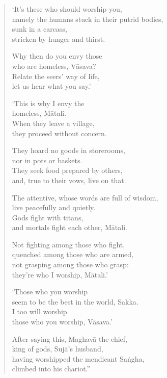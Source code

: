 \documentclass[12pt,openany]{book}%
\begin{document}
\begin{verse}%
‘It’s these who should worship you, \\
namely the humans stuck in their putrid bodies, \\
sunk in a carcass, \\
stricken by hunger and thirst. 

Why then do you envy those \\
who are homeless, \textsanskrit{Vāsava}? \\
Relate the seers’ way of life, \\
let us hear what you say.’ 

‘This is why I envy the \\
homeless, \textsanskrit{Mātali}. \\
When they leave a village, \\
they proceed without concern. 

They hoard no goods in storerooms, \\
nor in pots or baskets. \\
They seek food prepared by others, \\
and, true to their vows, live on that. 

The attentive, whose words are full of wisdom, \\
live peacefully and quietly. \\
Gods fight with titans, \\
and mortals fight each other, \textsanskrit{Mātali}. 

Not fighting among those who fight, \\
quenched among those who are armed, \\
not grasping among those who grasp: \\
they’re who I worship, \textsanskrit{Mātali}.’ 

‘Those who you worship \\
seem to be the best in the world, Sakka. \\
I too will worship \\
those who you worship, \textsanskrit{Vāsava}.’ 

After saying this, \textsanskrit{Maghavā} the chief, \\
king of gods, \textsanskrit{Sujā}’s husband, \\
having worshipped the mendicant \textsanskrit{Saṅgha}, \\
climbed into his chariot.” 

%
\end{verse}
\end{document}
